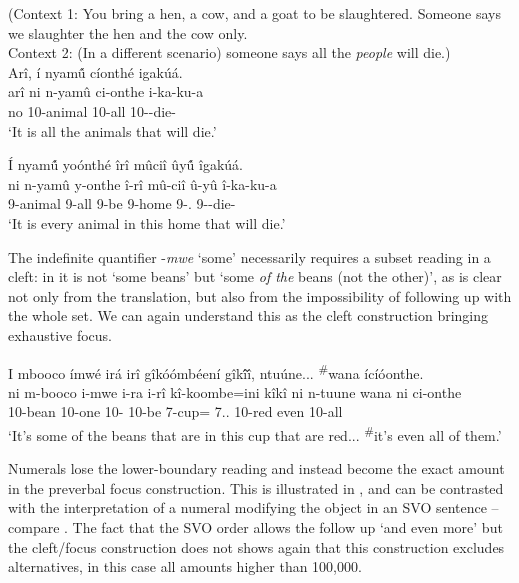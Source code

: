 \documentclass[output=paper]{langscibook}
\begin{document}
\z

\ea
\label{bkm:Ref111806543}
\ea
\label{bkm:Ref111806543:a}  (Context 1: You bring a hen, a cow, and a goat to be slaughtered. Someone says we slaughter the hen and the cow only.\\
Context 2: (In a different scenario) someone says all the \textit{people} will die.)\\
Arî, í nyam\'{û} cíonthé igakúá.\\
\gll
arî  ni  n-yamû  ci-onthe  i-ka-ku-a\\
no \FOC{} 10-animal   10-all 10\SM-\FUT{}-die-\FV{}\\
\glt ‘It is all the animals that will die.’

\ex
\label{bkm:Ref111806543:b}
 Í nyam\'{û} yoónthé îrî mûciî ûy\'{û} îgakúá.\\
\gll
ni  n-yamû  y-onthe  î-rî  mû-ciî  û-yû  î-ka-ku-a\\
\FOC{} 9-animal  9-all  9-be  9-home  9-\DEM.\PROX{} 9\SM-\FUT{}-die-\FV{}\\
\glt
‘It is every animal in this home that will die.’

\z
\z

The indefinite quantifier -\textit{mwe} ‘some’ necessarily requires a subset reading in a cleft: in  it is not ‘some beans’ but ‘some \textit{of the} beans (not the other)’, as is clear not only from the translation, but also from the impossibility of following up with the whole set. We can again understand this as the cleft construction bringing exhaustive focus.

\ea
\label{bkm:Ref111806111}
I mbooco ímwé irá irî gîkóómbéení gîk\'{î}\v{î}, ntuúne... \textsuperscript{\#}wana ícíóonthe.\\
\gll
ni  m-booco  i-mwe  i-ra  i-rî  kî-koombe=ini  kîkî  ni  n-tuune  wana  ni  ci-onthe\\
\FOC{} 10-bean  10-one  10-\RM{} 10\SM{}-be  7-cup=\LOC{} 7.\DEM.\PROX{} \COP{} 10-red  even \COP{} 10-all\\
\glt
‘It’s some of the beans that are in this cup that are red... \textsuperscript{\#}it’s even all of them.’

\z

Numerals lose the lower-boundary reading and instead become the exact amount in the preverbal focus construction. This is illustrated in , and can be contrasted with the interpretation of a numeral modifying the object in an SVO sentence – compare . The fact that the SVO order allows the follow up ‘and even more’ but the cleft/focus construction does not shows again that this construction excludes alternatives, in this case all amounts higher than 100,000.
\end{document}
